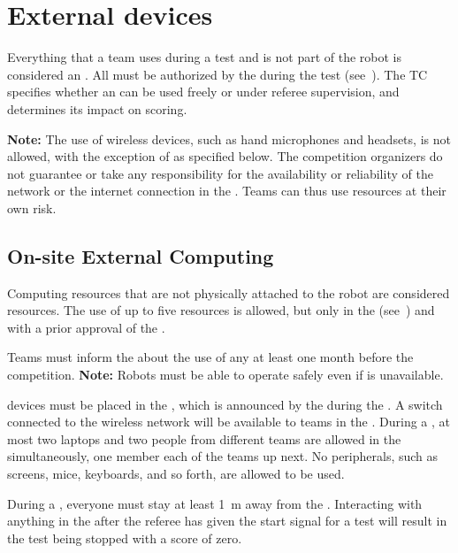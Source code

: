 \section{External devices}\label{rule:robot_external_devices}

Everything that a team uses during a test and is not part of the robot is considered an \ExternalDevice{}.
All \ExternalDevices{} must be authorized by the \TC{} during the \RobotInspection{} test (see~).
The TC specifies whether an \ExternalDevice{} can be used freely or under referee supervision, and determines its impact on scoring.

\textbf{Note:} The use of wireless devices, such as hand microphones and headsets, is not allowed, with the exception of \ExternalComputing{} as specified below.
The competition organizers do not guarantee or take any responsibility for the availability or reliability of the network or the internet connection in the \Arena{}.
Teams can thus use \ExternalComputing{} resources at their own risk.

\subsection{On-site External Computing}

Computing resources that are not physically attached to the robot are considered \ExternalComputing{} resources.
The use of up to five \ExternalComputing{} resources is allowed, but only in the \ArenaNetwork{} (see~) and with a prior approval of the \TC{}.

Teams must inform the \TC{} about the use of any \ExternalComputing{} at least one month before the competition.
\textbf{Note:} Robots must be able to operate safely even if \ExternalComputing{} is unavailable.

\ExternalComputing{} devices must be placed in the \ECRA{}, which is announced by the \TC{} during the \SetupDays{}.
A switch connected to the \Arena{} wireless network will be available to teams in the \ECRA{}.
During a \Testblock{}, at most two laptops and two people from different teams are allowed in the \ECRA{} simultaneously, one member each of the teams up next.
No peripherals, such as screens, mice, keyboards, and so forth, are allowed to be used.

During a \Testslot{}, everyone must stay at least \SI{1}{\meter} away from the \ECRA{}.
Interacting with anything in the \ECRA{} after the referee has given the start signal for a test will result in the test being stopped with a score of zero.

